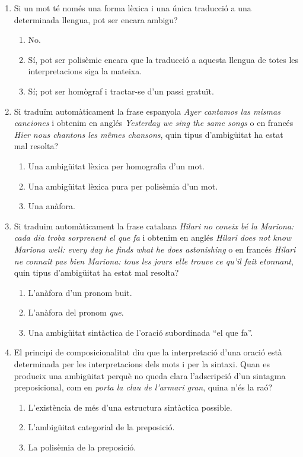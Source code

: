 \begin{enumerate}
\item Si un mot té només una forma lèxica i una única traducció a una
  determinada llengua, pot ser encara ambigu?
  \begin{enumerate}
  \item No.
  \item Sí, pot ser polisèmic encara que la traducció a aquesta
    llengua de totes les interpretacions siga la mateixa.
  \item Sí; pot ser homògraf i tractar-se d'un passi gratuït.
  \end{enumerate}

\item Si traduïm automàticament la frase espanyola \emph{Ayer cantamos
    las mismas canciones} i obtenim en anglés \emph{Yesterday we sing
    the same songs} o en francés \emph{Hier nous chantons les mêmes
    chansons}, quin tipus d'ambigüitat ha estat mal resolta?
  \begin{enumerate}
  \item Una ambigüitat lèxica per homografia d'un mot.
  \item Una ambigüitat lèxica pura per polisèmia d'un mot.
  \item Una anàfora.
  \end{enumerate}

\item Si traduim automàticament la frase catalana \emph{Hilari no coneix
  bé la Mariona: cada dia troba sorprenent el que fa} i obtenim en
  anglés \emph{Hilari does not know Mariona well: every day he finds what
  he does astonishing} o en francés \emph{Hilari ne connaît pas bien
  Mariona: tous les jours elle trouve ce qu'il fait etonnant}, quin
  tipus d'ambigüitat ha estat mal resolta?
  \begin{enumerate}
  \item L'anàfora d'un pronom buit.
  \item L'anàfora del pronom \emph{que}.
  \item Una ambigüitat sintàctica de l'oració subordinada ``el que
    fa''.
  \end{enumerate}

\item El principi de composicionalitat diu que la interpretació d'una
  oració està determinada per les interpretacions dels mots i per la
  sintaxi. Quan es produeix una ambigüitat perquè no queda clara
  l'adscripció d'un sintagma preposicional, com en \emph{porta la clau
    de l'armari gran}, quina n'és la raó?  
  \begin{enumerate}
  \item L'existència de més d'una estructura sintàctica possible.
  \item L'ambigüitat categorial de la preposició.
  \item La polisèmia de la preposició.
  \end{enumerate}


\end{enumerate}
